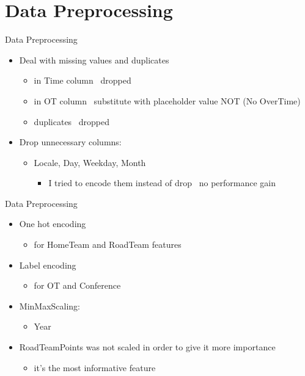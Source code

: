 \documentclass{beamer}
\begin{document}
\section{Data Preprocessing}
\begin{frame}{Data Preprocessing}
    \begin{itemize}
        \item Deal with missing values and duplicates
            \begin{itemize}
                \item in Time column \textrightarrow\  dropped
                \item in OT column \textrightarrow\  substitute with placeholder value NOT (No OverTime)
                \item duplicates \textrightarrow\  dropped
            \end{itemize}
        \item Drop unnecessary columns:
            \begin{itemize}
                \item Locale, Day, Weekday, Month
                    \begin{itemize}
                        \item I tried to encode them instead of drop \textrightarrow\  no performance gain
                    \end{itemize}
            \end{itemize}
    \end{itemize}
\end{frame}

\begin{frame}{Data Preprocessing}
    \begin{itemize}
        \item One hot encoding
        \begin{itemize}
            \item for HomeTeam and RoadTeam features
        \end{itemize}

        \item Label encoding
        \begin{itemize}
            \item for OT and Conference
        \end{itemize}

        \item MinMaxScaling:
            \begin{itemize}
                \item Year
            \end{itemize}

        \item RoadTeamPoints was not scaled in order to give it more importance
        \begin{itemize}
            \item it's the most informative feature
        \end{itemize}
    \end{itemize}
    
\end{frame}
\end{document}
